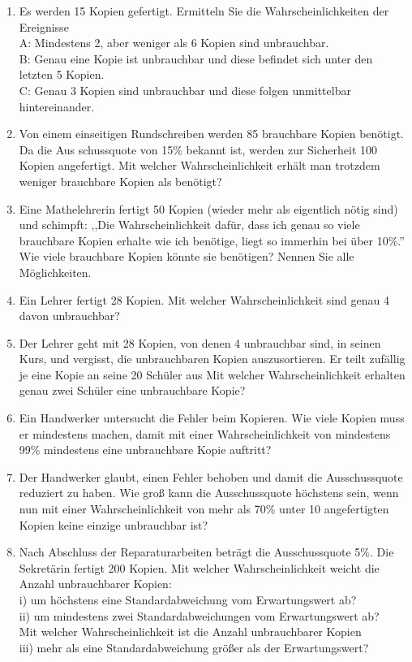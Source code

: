 \documentclass[a4paper,12pt]{article}
\begin{document}
\begin{enumerate}[label={\alph*)}]
  \item Es werden 15 Kopien gefertigt. Ermitteln Sie die Wahrscheinlichkeiten der Ereignisse\\
    A: Mindestens 2, aber weniger als 6 Kopien sind unbrauchbar.\\
    B: Genau eine Kopie ist unbrauchbar und diese befindet sich unter den letzten 5 Kopien.\\
    C: Genau 3 Kopien sind unbrauchbar und diese folgen unmittelbar hintereinander.
  \item Von einem einseitigen Rundschreiben werden 85 brauchbare Kopien benötigt. Da die Aus schussquote von 15\% bekannt ist, werden zur Sicherheit 100 Kopien angefertigt. Mit welcher Wahrscheinlichkeit erhält man trotzdem weniger brauchbare Kopien als benötigt?
  \item Eine Mathelehrerin fertigt 50 Kopien (wieder mehr als eigentlich nötig sind) und schimpft: ,,Die Wahrscheinlichkeit dafür, dass ich genau so viele brauchbare Kopien erhalte wie ich benötige, liegt so immerhin bei über 10\%.'' Wie viele brauchbare Kopien könnte sie benötigen? Nennen Sie alle Möglichkeiten.
  \item Ein Lehrer fertigt 28 Kopien. Mit welcher Wahrscheinlichkeit sind genau 4 davon unbrauchbar?
  \item Der Lehrer geht mit 28 Kopien, von denen 4 unbrauchbar sind, in seinen Kurs, und vergisst, die unbrauchbaren Kopien auszusortieren. Er teilt zufällig je eine Kopie an seine 20 Schüler aus Mit welcher Wahrscheinlichkeit erhalten genau zwei Schüler eine unbrauchbare Kopie?
  \item Ein Handwerker untersucht die Fehler beim Kopieren. Wie viele Kopien muss er mindestens machen, damit mit einer Wahrscheinlichkeit von mindestens 99\% mindestens eine unbrauchbare Kopie auftritt? 
  \item Der Handwerker glaubt, einen Fehler behoben und damit die Ausschussquote reduziert zu haben. Wie groß kann die Ausschussquote höchstens sein, wenn nun mit einer Wahrscheinlichkeit von mehr als 70\% unter 10 angefertigten Kopien keine einzige unbrauchbar ist?
  \item Nach Abschluss der Reparaturarbeiten beträgt die Ausschussquote 5\%. Die Sekretärin fertigt 200 Kopien. Mit welcher Wahrscheinlichkeit weicht die Anzahl unbrauchbarer Kopien:\\
    i) um höchstens eine Standardabweichung vom Erwartungswert ab?\\
    ii) um mindestens zwei Standardabweichungen vom Erwartungswert ab?\\
    Mit welcher Wahrscheinlichkeit ist die Anzahl unbrauchbarer Kopien\\
    iii) mehr als eine Standardabweichung größer als der Erwartungswert?
\end{enumerate}
\end{document}
